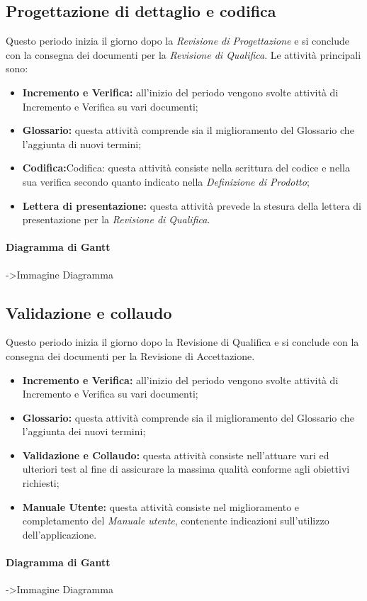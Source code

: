 \subsection{Progettazione di dettaglio e codifica}
Questo periodo inizia il giorno dopo la \textit{Revisione di Progettazione} e si conclude
con la consegna dei documenti per la \textit{Revisione di Qualifica}. Le attività principali sono:
\begin{itemize}
	\item{\textbf{Incremento e Verifica:} all’inizio del periodo vengono svolte attività di Incremento e Verifica su vari documenti;}
	\item{\textbf{Glossario:} questa attività comprende sia il miglioramento del Glossario che
l’aggiunta di nuovi termini;}
	\item{\textbf{Codifica:}Codifica: questa attività consiste nella scrittura del codice e nella sua verifica secondo quanto indicato nella \textit{Definizione di Prodotto};}
	\item{\textbf{Lettera di presentazione:} questa attività prevede la stesura della lettera
di presentazione per la \textit{Revisione di Qualifica}.}
\end{itemize}
\paragraph{Diagramma di Gantt}
->Immagine Diagramma
\subsection{Validazione e collaudo}
Questo periodo inizia il giorno dopo la Revisione di Qualifica e si conclude con la consegna dei documenti per la Revisione di Accettazione. 
\begin{itemize}
\item{\textbf{Incremento e Verifica:} all’inizio del periodo vengono svolte attività di Incremento e Verifica su vari documenti;}
\item{\textbf{Glossario:} questa attività comprende sia il miglioramento del Glossario che
l’aggiunta dei nuovi termini;}
\item{\textbf{Validazione e Collaudo:} questa attività consiste nell'attuare vari ed ulteriori test al fine di assicurare la massima qualità conforme agli obiettivi richiesti;}
\item{\textbf{Manuale Utente:} questa attività consiste nel miglioramento e completamento del \textit{Manuale utente}, contenente indicazioni sull’utilizzo dell’applicazione.}
\end{itemize}
\paragraph{Diagramma di Gantt}
->Immagine Diagramma

	